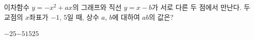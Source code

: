 이차함수 $y=-x^2+ax$의 그래프와 직선 $y=x-b$가 서로 다른 두 점에서 만난다. 두 교점의 $x$좌표가 $-1$, $5$일 때, 상수 $a$, $b$에 대하여 $ab$의 값은?
\begin{choices32}{$-25$}{$-5$}{$1$}{$5$}{$25$}\end{choices32}
